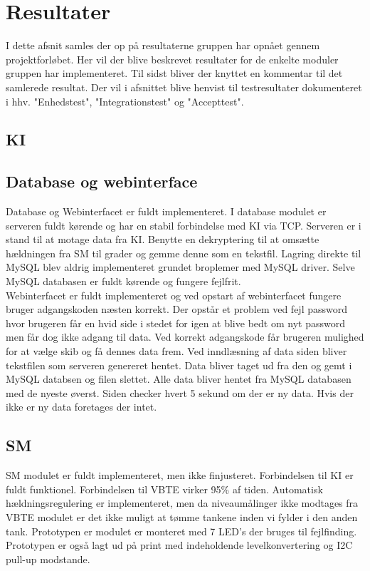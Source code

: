 \section{Resultater}
I dette afsnit samles der op på resultaterne gruppen har opnået gennem projektforløbet. Her vil der blive beskrevet resultater for de enkelte moduler gruppen har implementeret. Til sidst bliver der knyttet en kommentar til det samlerede resultat. Der vil i afsnittet blive henvist til testresultater dokumenteret i hhv. "Enhedstest", "Integrationstest" og "Accepttest".

\subsection{KI}

\subsection{Database og webinterface}
Database og Webinterfacet er fuldt implementeret. I database modulet er serveren fuldt kørende og har en stabil forbindelse med KI via TCP. Serveren er i stand til at motage data fra KI. Benytte en dekryptering til at omsætte hældningen fra SM til grader og gemme denne som en tekstfil. Lagring direkte til MySQL blev aldrig implementeret grundet broplemer med MySQL driver. Selve MySQL databasen er fuldt kørende og fungere fejlfrit. \\
Webinterfacet er fuldt implementeret og ved opstart af webinterfacet fungere bruger adgangskoden næsten korrekt. Der opstår et problem ved fejl password hvor brugeren får en hvid side i stedet for igen at blive bedt om nyt password men får dog ikke adgang til data. Ved korrekt adgangskode får brugeren mulighed for at vælge skib og få dennes data frem. Ved inndlæsning af data siden bliver tekstfilen som serveren genereret hentet. Data bliver taget ud fra den og gemt i MySQL databsen og filen slettet. Alle data bliver hentet fra MySQL databasen med de nyeste øverst. Siden checker hvert 5 sekund om der er ny data. Hvis der ikke er ny data foretages der intet.

\subsection{SM}
SM modulet er fuldt implementeret, men ikke finjusteret. Forbindelsen til KI er fuldt funktionel. Forbindelsen til VBTE virker 95\% af tiden. Automatisk hældningsregulering er implementeret, men da niveaumålinger ikke modtages fra VBTE modulet er det ikke muligt at tømme tankene inden vi fylder i den anden tank. Prototypen er modulet er monteret med 7 LED's der bruges til fejlfinding. Prototypen er også lagt ud på print med indeholdende levelkonvertering og I2C pull-up modstande.

